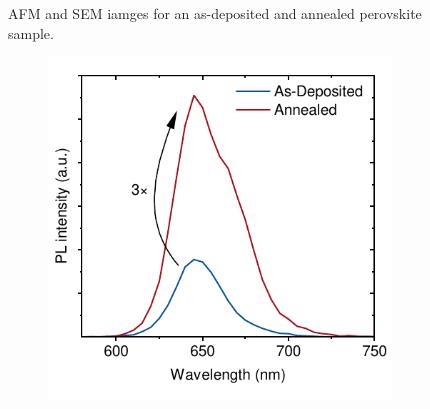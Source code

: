 \begin{figure}[htbp]
\begin{subfigure}[t]{0.4\textwidth}
        \caption{}
        \label{fig:ch2:sem_after}
    \end{subfigure}
    \caption{AFM and SEM iamges for an as-deposited and annealed perovskite sample.}
    \label{fig:ch2:afm_sem}
\end{figure}


\begin{figure}[htbp]
    \centering
    \begin{subfigure}[t]{0.45\textwidth}
        \centering
        \includegraphics[width=\textwidth]{chapters/material_properties/images/SSPL.pdf} 
        \caption{}
        \label{fig:ch2:sspl}
    \end{subfigure}
    \hfill
    \begin{subfigure}[t]{0.45\textwidth}
        \centering

\end{subfigure}
\end{figure}
